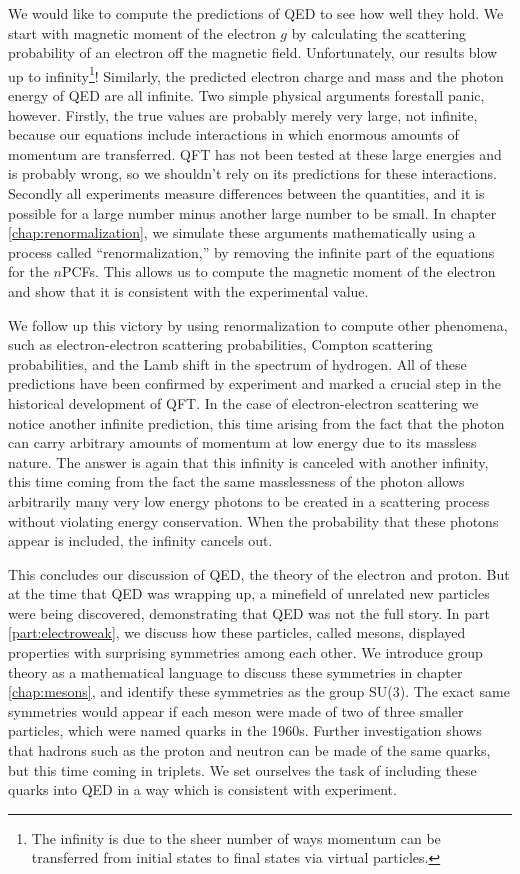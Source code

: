 We would like to compute the predictions of QED to see how well they hold. We start with magnetic moment of the electron $g$ by calculating the scattering probability of an electron off the magnetic field. Unfortunately, our results blow up to infinity\footnote{The infinity is due to the sheer number of ways momentum can be transferred from initial states to final states via virtual particles.}! Similarly, the predicted electron charge and mass and the photon energy of QED are all infinite. Two simple physical arguments forestall panic, however. Firstly, the true values are probably merely very large, not infinite, because our equations include interactions in which enormous amounts of momentum are transferred. QFT has not been tested at these large energies and is probably wrong, so we shouldn't rely on its predictions for these interactions. Secondly all experiments measure differences between the quantities, and it is possible for a large number minus another large number to be small. In chapter \ref{chap:renormalization}, we simulate these arguments mathematically using a process called ``renormalization,'' by removing the infinite part of the equations for the $n$PCFs. This allows us to compute the magnetic moment of the electron and show that it is consistent with the experimental value.

We follow up this victory by using renormalization to compute other phenomena, such as electron-electron scattering probabilities, Compton scattering probabilities, and the Lamb shift in the spectrum of hydrogen. All of these predictions have been confirmed by experiment and marked a crucial step in the historical development of QFT. In the case of electron-electron scattering we notice another infinite prediction, this time arising from the fact that the photon can carry arbitrary amounts of momentum at low energy due to its massless nature. The answer is again that this infinity is canceled with another infinity, this time coming from the fact the same masslessness of the photon allows arbitrarily many very low energy photons to be created in a scattering process without violating energy conservation. When the probability that these photons appear is included, the infinity cancels out.

This concludes our discussion of QED, the theory of the electron and proton. But at the time that QED was wrapping up, a minefield of unrelated new particles were being discovered, demonstrating that QED was not the full story. In part \ref{part:electroweak}, we discuss how these particles, called mesons, displayed properties with surprising symmetries among each other. We introduce group theory as a mathematical language to discuss these symmetries in chapter \ref{chap:mesons}, and identify these symmetries as the group SU(3). The exact same symmetries would appear if each meson were made of two of three smaller particles, which were named quarks in the 1960s. Further investigation shows that hadrons such as the proton and neutron can be made of the same quarks, but this time coming in triplets. We set ourselves the task of including these quarks into QED in a way which is consistent with experiment.

